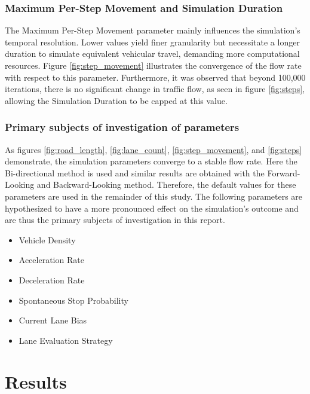 \documentclass{article}
\begin{document}
\subsubsection{Maximum Per-Step Movement and Simulation Duration}
The Maximum Per-Step Movement parameter mainly influences the simulation's temporal resolution. Lower values yield finer granularity but necessitate a longer duration to simulate equivalent vehicular travel, demanding more computational resources. Figure \ref{fig:step_movement} illustrates the convergence of the flow rate with respect to this parameter. Furthermore, it was observed that beyond 100,000 iterations, there is no significant change in traffic flow, as seen in figure \ref{fig:steps}, allowing the Simulation Duration to be capped at this value. 

\subsubsection{Primary subjects of investigation of parameters}
As figures \ref{fig:road_length}, \ref{fig:lane_count}, \ref{fig:step_movement}, and \ref{fig:steps} demonstrate, the simulation parameters converge to a stable flow rate. Here the Bi-directional method is used and similar results are obtained with the Forward-Looking and Backward-Looking method. Therefore, the default values for these parameters are used in the remainder of this study. The following parameters are hypothesized to have a more pronounced effect on the simulation's outcome and are thus the primary subjects of investigation in this report.

\begin{itemize}
\item Vehicle Density
\item Acceleration Rate
\item Deceleration Rate
\item Spontaneous Stop Probability
\item Current Lane Bias
\item Lane Evaluation Strategy
\end{itemize}

\section{Results}
\end{document}
